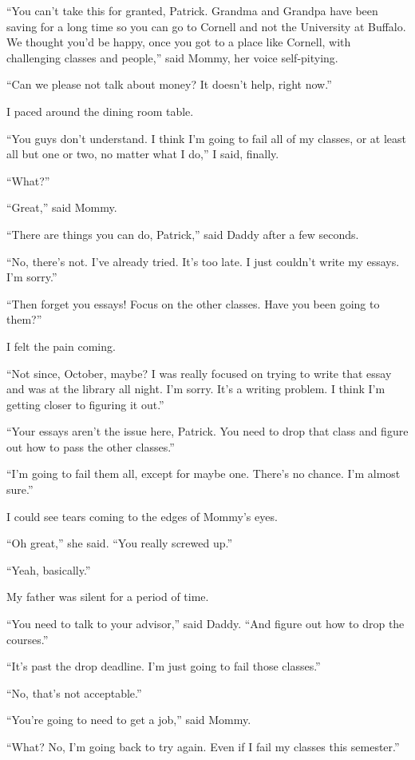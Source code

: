``You can't take this for granted, Patrick.  Grandma and Grandpa have been saving
for a long time so you can go to Cornell and not the University at Buffalo.  We
thought you'd be happy, once you got to a place like Cornell, with challenging
classes and people,'' said Mommy, her voice self-pitying.

``Can we please not talk about money?  It doesn't help, right now.''

I paced around the dining room table.

``You guys don't understand.  I think I'm going to fail all of my classes, or at
least all but one or two, no matter what I do,'' I said, finally.

``What?''

``Great,'' said Mommy.

``There are things you can do, Patrick,'' said Daddy after a few seconds.

``No, there's not.  I've already tried.  It's too late.  I just couldn't write my essays.  I'm
sorry.''

``Then forget you essays!  Focus on the other classes.  Have you been going to
them?''

I felt the pain coming.

``Not since, October, maybe?  I was really focused on trying to write that essay
and was at the library all night.  I'm sorry.  It's a writing problem.  I think
I'm getting closer to figuring it out.''
 
``Your essays aren't the issue here, Patrick.  You need to drop that class and
figure out how to pass the other classes.''

``I'm going to fail them all, except for maybe one.  There's no chance.  I'm
almost sure.''

I could see tears coming to the edges of Mommy's eyes.

``Oh great,'' she said.  ``You really screwed up.''

``Yeah, basically.''

My father was silent for a period of time.

``You need to talk to your advisor,'' said Daddy.  ``And figure out how to drop the
courses.''

``It's past the drop deadline.  I'm just going to fail those classes.''

``No, that's not acceptable.''

``You're going to need to get a job,'' said Mommy.

``What?  No, I'm going back to try again.  Even if I fail my classes this semester.''

